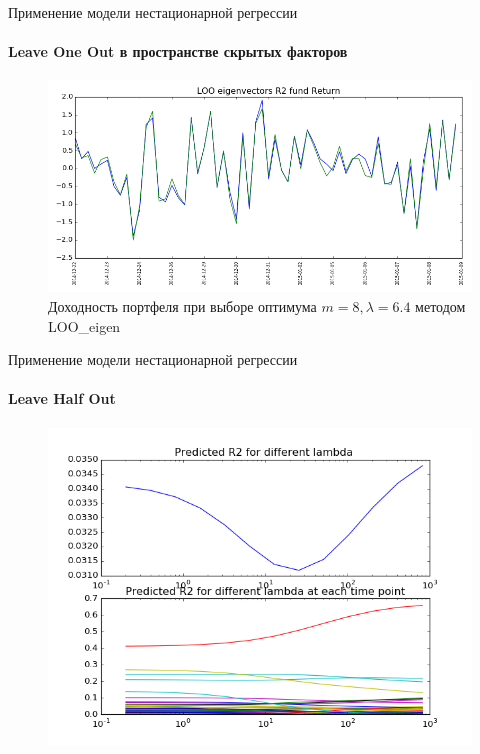 \documentclass[11pt]{beamer}
\begin{document}
\begin{frame}{Применение модели нестационарной регрессии}
\framesubtitle{Leave One Out в пространстве скрытых факторов}
\begin{figure}
	\centering
	\includegraphics[scale=0.38]{looeig_return.png}
	\caption{Доходность портфеля при выборе оптимума $m=8,\lambda=6.4$ методом LOO\_eigen}
\end{figure}
\end{frame}

\begin{frame}{Применение модели нестационарной регрессии}
\framesubtitle{Leave Half Out}

\begin{figure}
\centering
\includegraphics[scale=0.4]{lho_r2.png}
\end{figure}
\end{frame}
\end{document}
